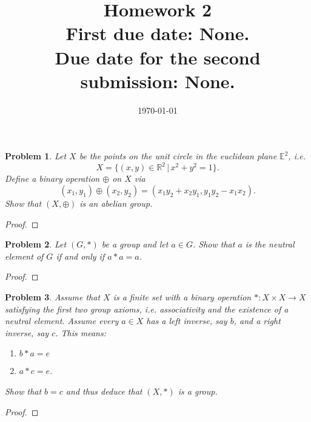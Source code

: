 \documentclass[reqno]{amsart}
\theoremstyle{plain}
\newtheorem{problem}{Problem}
\theoremstyle{definition}
\begin{document}
 

\title[Homework 2]{Homework 2 \\ First due date: None.  \\  Due date for the second submission:  None.}

\date{\today} 
\maketitle 


\begin{problem}
Let $X$ be the points on the unit circle in the euclidean plane $\mathbb{E}^{2}$, i.e.
$$X = \{(x,y) \in \mathbb{R}^{2} \, | \, x^{2} + y^{2} = 1 \}. $$
Define a binary operation $\oplus$ on $X$ via
$$(x_{1},y_{1}) \oplus (x_{2},y_{2}) = (x_{1}y_{2} + x_{2}y_{1},y_{1}y_{2} - x_{1}x_{2}). $$
Show that $(X,\oplus)$ is an abelian group.
\end{problem}
\begin{proof}

\end{proof}


\begin{problem}
Let $(G,*)$ be a group and let $a \in G$.  Show that $a$ is the neutral element of $G$ if and only if $a * a = a$.
\end{problem}
\begin{proof}

\end{proof}

\begin{problem}
Assume that $X$ is a finite set with a binary operation $*:X \times X \longrightarrow X$ satisfying the first two group axioms, i.e. associativity and the existence of a neutral element.  Assume every $a \in X$ has a left inverse, say $b$, and a right inverse, say $c$.  This means:
\begin{enumerate}
\item $b * a = e$
\item $a * c = e$.
\end{enumerate}
Show that $b = c$ and thus deduce that $(X,*)$ is a group.
\end{problem}
\begin{proof}

\end{proof}
\end{document}
